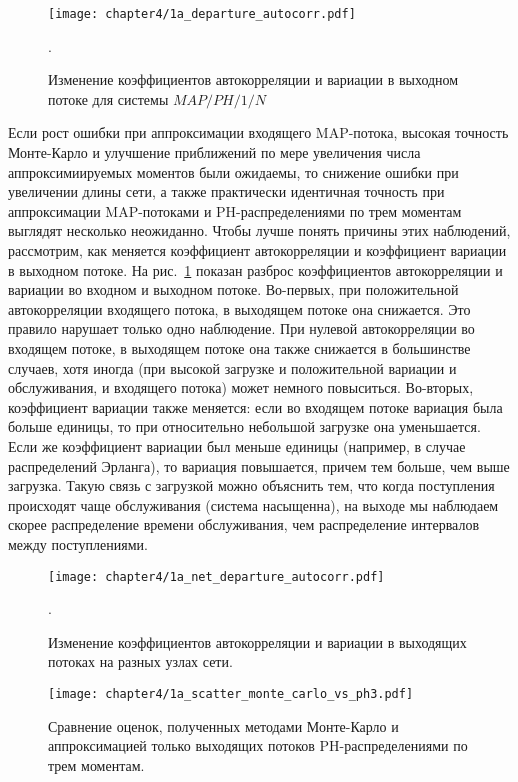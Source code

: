 \begin{figure}[h]
    \texttt{[image: chapter4/1a\_departure\_autocorr.pdf]}
    \caption{Изменение коэффициентов автокорреляции и вариации в выходном потоке для системы $MAP/PH/1/N$}.\label{fig:results-departure-coefs}
\end{figure}

Если рост ошибки при аппроксимации входящего MAP-потока, высокая точность Монте-Карло и улучшение приближений по мере увеличения числа аппроксимиируемых моментов были ожидаемы, то снижение ошибки при увеличении длины сети, а также практически идентичная точность при аппроксимации MAP-потоками и PH-распределениями по трем моментам выглядят несколько неожиданно. Чтобы лучше понять причины этих наблюдений, рассмотрим, как меняется коэффициент автокорреляции и коэффициент вариации в выходном потоке. На рис.~\ref{fig:results-departure-coefs} показан разброс коэффициентов автокорреляции и вариации во входном и выходном потоке. Во-первых, при положительной автокорреляции входящего потока, в выходящем потоке она снижается. Это правило нарушает только одно наблюдение. При нулевой автокорреляции во входящем потоке, в выходящем потоке она также снижается в большинстве случаев, хотя иногда (при высокой загрузке и положительной вариации и обслуживания, и входящего потока) может немного повыситься. Во-вторых, коэффициент вариации также меняется: если во входящем потоке вариация была больше единицы, то при относительно небольшой загрузке она уменьшается. Если же коэффициент вариации был меньше единицы (например, в случае распределений Эрланга), то вариация повышается, причем тем больше, чем выше загрузка. Такую связь с загрузкой можно объяснить тем, что когда поступления происходят чаще обслуживания (система насыщенна), на выходе мы наблюдаем скорее распределение времени обслуживания, чем распределение интервалов между поступлениями.

\begin{figure}[h]
    \texttt{[image: chapter4/1a\_net\_departure\_autocorr.pdf]}
    \caption{Изменение коэффициентов автокорреляции и вариации в выходящих потоках на разных узлах сети.}.\label{fig:results-net-departure-coefs}
\end{figure}

\begin{figure}[h]
    \texttt{[image: chapter4/1a\_scatter\_monte\_carlo\_vs\_ph3.pdf]}
    \caption{Сравнение оценок, полученных методами Монте-Карло и аппроксимацией только выходящих потоков PH-распределениями по трем моментам.}\label{fig:results-approx-mc-vs-ph3}
\end{figure}

